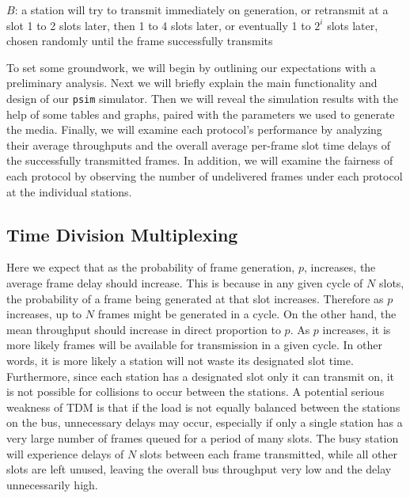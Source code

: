 \documentclass[twocolumn]{article}
\begin{document}
$B$: a station will try to transmit immediately on generation, or retransmit at
a slot 1 to 2 slots later, then 1 to 4 slots later, or eventually 1 to $2^i$
slots later, chosen randomly until the frame successfully transmits

	To set some groundwork, we will begin by outlining our expectations with
	a preliminary analysis. Next we will briefly explain the main
	functionality and design of our \verb|psim| simulator. Then we will reveal the
	simulation results with the help of some tables and graphs, paired with
	the parameters we used to generate the media. Finally, we will examine
	each protocol's performance by analyzing their average throughputs and
	the overall average per-frame slot time delays of the successfully
	transmitted frames. In addition, we will examine the fairness of each
	protocol by observing the number of undelivered frames under each
	protocol at the individual stations.

\subsection*{Time Division Multiplexing} Here we expect that as the probability
of frame generation, $p$, increases, the average frame delay should increase. This is
because in any given cycle of $N$ slots, the probability of a frame being
generated at that slot increases. Therefore as $p$ increases, up to $N$ frames
might be generated in a cycle.  On the other hand, the mean throughput should
increase in direct proportion to $p$. As $p$ increases, it is more likely frames
will be available for transmission in a given cycle. In other words, it is more
likely a station will not waste its designated slot time. Furthermore, since
each station has a designated slot only it can transmit on, it is not possible
for collisions to occur between the stations. 
A potential serious weakness of TDM is that if the load is not equally balanced 
between the stations on the bus, unnecessary delays may occur, especially if only
a single station has a very large number of frames queued for a period of many slots.
The busy station will experience delays of $N$ slots between each frame transmitted,
while all other slots are left unused, leaving the overall bus throughput very low and
the delay unnecessarily high.
\end{document}

